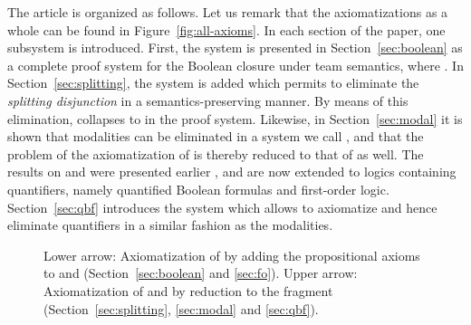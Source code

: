 \documentclass[a4paper,english,fleqn,11pt,final]{scrartcl}
\theoremstyle{plain}
\theoremstyle{definition}
\begin{document}
\smallskip

The article is organized as follows.
Let us remark that the axiomatizations as a whole can be found in Figure~\ref{fig:all-axioms}.
In each section of the paper, one subsystem is introduced.
First, the system  is presented in Section~\ref{sec:boolean} as a complete proof system for the Boolean closure  under team semantics, where .
In Section~\ref{sec:splitting}, the system  is added which permits to eliminate the \emph{splitting disjunction}  in a semantics-preserving manner.
By means of this elimination,  collapses to  in the proof system.
Likewise, in Section~\ref{sec:modal} it is shown that modalities can be eliminated in a system we call , and that the problem of the axiomatization of  is thereby reduced to that of  as well.
The results on  and  were presented earlier \cite{csl16axiom}, and are now extended to logics containing quantifiers, namely quantified Boolean formulas and first-order logic.
Section~\ref{sec:qbf} introduces the system  which allows to axiomatize and hence eliminate quantifiers in a similar fashion as the modalities.


\begin{figure}\centering
{}
\caption{Lower arrow: Axiomatization of  by adding the propositional axioms  to  and  (Section~\ref{sec:boolean} and \ref{sec:fo}).
Upper arrow: Axiomatization of  and  by reduction to the  fragment (Section~\ref{sec:splitting}, \ref{sec:modal} and \ref{sec:qbf}).\label{fig:overview}}
\end{figure}
\end{document}
